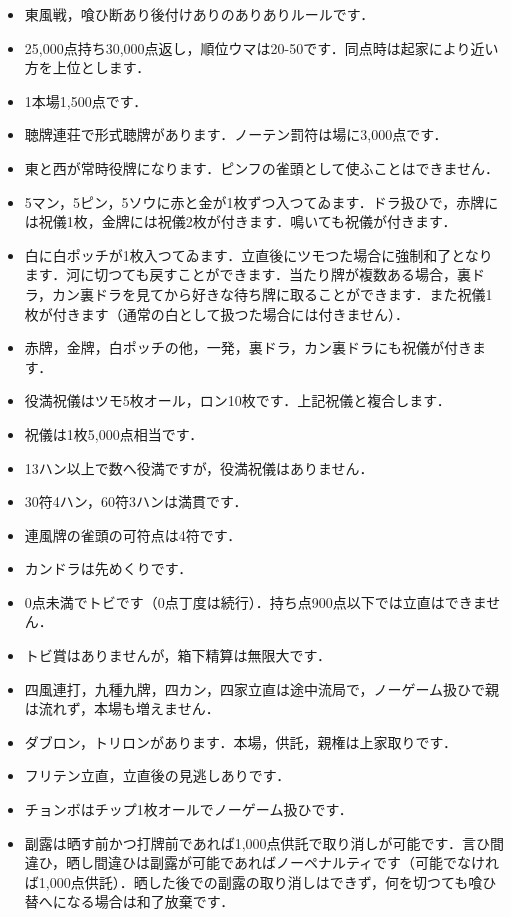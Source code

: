 \documentclass[uplatex]{jsarticle}
\begin{document}
\begin{itemize}
    \item 東風戦，喰ひ断あり後付けありのありありルールです．
    \item 25,000点持ち30,000点返し，順位ウマは20-50です．同点時は起家により近い方を上位とします．
    \item 1本場1,500点です．
    \item 聴牌連荘で形式聴牌があります．ノーテン罰符は場に3,000点です．
    \item 東と西が常時役牌になります．ピンフの雀頭として使ふことはできません．
    \item 5マン，5ピン，5ソウに赤と金が1枚ずつ入つてゐます．ドラ扱ひで，赤牌には祝儀1枚，金牌には祝儀2枚が付きます．鳴いても祝儀が付きます．
    \item 白に白ポッチが1枚入つてゐます．立直後にツモつた場合に強制和了となります．河に切つても戻すことができます．当たり牌が複数ある場合，裏ドラ，カン裏ドラを見てから好きな待ち牌に取ることができます．また祝儀1枚が付きます（通常の白として扱つた場合には付きません）．
    \item 赤牌，金牌，白ポッチの他，一発，裏ドラ，カン裏ドラにも祝儀が付きます．
    \item 役満祝儀はツモ5枚オール，ロン10枚です．上記祝儀と複合します．
    \item 祝儀は1枚5,000点相当です．
    \item 13ハン以上で数へ役満ですが，役満祝儀はありません．
    \item 30符4ハン，60符3ハンは満貫です．
    \item 連風牌の雀頭の可符点は4符です．
    \item カンドラは先めくりです．
    \item 0点未満でトビです（0点丁度は続行）．持ち点900点以下では立直はできません．
    \item トビ賞はありませんが，箱下精算は無限大です．
    \item 四風連打，九種九牌，四カン，四家立直は途中流局で，ノーゲーム扱ひで親は流れず，本場も増えません．
    \item ダブロン，トリロンがあります．本場，供託，親権は上家取りです．
    \item フリテン立直，立直後の見逃しありです．
    \item チョンボはチップ1枚オールでノーゲーム扱ひです．
    \item 副露は晒す前かつ打牌前であれば1,000点供託で取り消しが可能です．言ひ間違ひ，晒し間違ひは副露が可能であればノーペナルティです（可能でなければ1,000点供託）．晒した後での副露の取り消しはできず，何を切つても喰ひ替へになる場合は和了放棄です．

\end{itemize}
\end{document}
